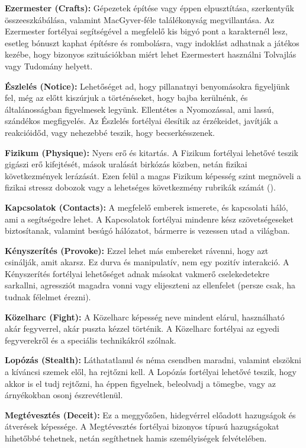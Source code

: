 \textbf{Ezermester (Crafts):} Gépezetek építése vagy éppen elpusztítása, szerkentyűk összeeszkábálása, valamint MacGyver‑féle találékonyság megvillantása. Az Ezermester fortélyai segítségével a megfelelő kis bigyó pont a karakternél lesz, esetleg bónuszt kaphat építésre és rombolásra, vagy indoklást adhatnak a játékos kezébe, hogy bizonyos szituációkban miért lehet Ezermestert használni Tolvajlás vagy Tudomány helyett.

\textbf{Észlelés (Notice):} Lehetőséget ad, hogy pillanatnyi benyomásokra figyeljünk fel, még az előtt kiszúrjuk a történéseket, hogy bajba kerülnénk, és általánosságban figyelmesek legyünk. Ellentétes a Nyomozással, ami lassú, szándékos megfigyelés. Az Észlelés fortélyai élesítik az érzékeidet, javítják a reakcióidőd, vagy nehezebbé teszik, hogy becserkésszenek.

\textbf{Fizikum (Physique):} Nyers erő és kitartás. A Fizikum fortélyai lehetővé teszik gigászi erő kifejtését, mások uralását birkózás közben, netán fizikai következmények lerázását. Ezen felül a magas Fizikum képesség szint megnöveli a fizikai stressz dobozok vagy a lehetséges következmény rubrikák számát ().

\textbf{Kapcsolatok (Contacts):} A megfelelő emberek ismerete, és kapcsolati háló, ami a segítségedre lehet. A Kapcsolatok fortélyai mindenre kész szövetségeseket biztosítanak, valamint besúgó hálózatot, bármerre is vezessen utad a világban.

\newpage

\textbf{Kényszerítés (Provoke):} Ezzel lehet más embereket rávenni, hogy azt csinálják, amit akarsz. Ez durva és manipulatív, nem egy pozitív interakció. A Kényszerítés fortélyai lehetőséget adnak másokat vakmerő cselekedetekre sarkallni, agressziót magadra vonni vagy elijeszteni az ellenfelet (persze csak, ha tudnak félelmet érezni).

\textbf{Közelharc (Fight):} A Közelharc képesség neve mindent elárul, használható akár fegyverrel, akár puszta  kézzel történik. A Közelharc fortélyai az egyedi fegyverekről és a speciális technikákról szólnak.

\textbf{Lopózás (Stealth):} Láthatatlanul és néma csendben maradni, valamint elszökni a kíváncsi szemek elől, ha rejtőzni kell. A Lopózás fortélyai lehetővé teszik, hogy akkor is el tudj rejtőzni, ha éppen figyelnek, beleolvadj a tömegbe, vagy az árnyékokban osonj észrevétlenül.

\textbf{Megtévesztés (Deceit):} Ez a meggyőzően, hidegvérrel előadott hazugságok és átverések képessége. A Megtévesztés fortélyai bizonyos típusú hazugságokat hihetőbbé tehetnek, netán segíthetnek hamis személyiségek felvételében.

